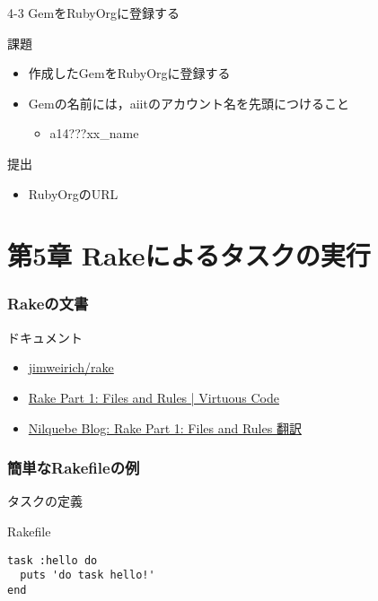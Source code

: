 \documentclass[t, aspectratio=169]{beamer}
\begin{document}
\begin{frame}[label=sec-4-4-3]{4-3 GemをRubyOrgに登録する}
\begin{block}{課題}
\begin{itemize}
\item 作成したGemをRubyOrgに登録する
\item Gemの名前には，aiitのアカウント名を先頭につけること
\begin{itemize}
\item a14???xx\_name
\end{itemize}
\end{itemize}
\end{block}
\begin{block}{提出}
\begin{itemize}
\item RubyOrgのURL
\end{itemize}
\end{block}
\end{frame}
\part{第5章 Rakeによるタスクの実行}
\label{sec-5}
\section{Rakeの文書}
\label{sec-5-1}
\begin{frame}[label=sec-5-1-1]{ドキュメント}
\begin{itemize}
\item \href{https://github.com/jimweirich/rake}{jimweirich/rake}
\item \href{http://devblog.avdi.org/2014/04/21/rake-part-1-basics/}{Rake Part 1: Files and Rules | Virtuous Code}
\item \href{http://nilquebe.blogspot.jp/2014/06/learn-advanced-rake-in-7-episodes.html}{Nilquebe Blog: Rake Part 1: Files and Rules 翻訳}
\end{itemize}
\end{frame}

\section{簡単なRakefileの例}
\label{sec-5-2}
\begin{frame}[fragile,label=sec-5-2-1]{タスクの定義}
 \begin{block}{Rakefile}
\begin{verbatim}
task :hello do
  puts 'do task hello!'
end
\end{verbatim}
\end{block}
\end{frame}
\end{document}

